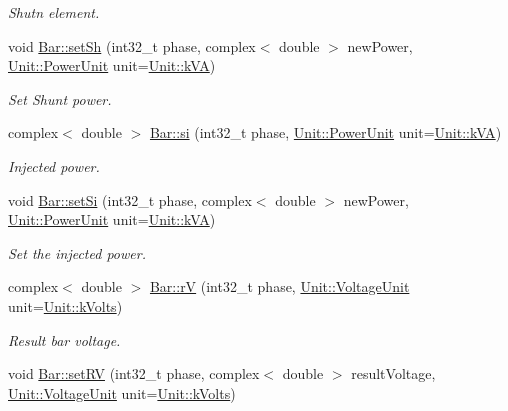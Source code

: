 \begin{DoxyCompactItemize}
\begin{DoxyCompactList}\small\item\em Shutn element. \end{DoxyCompactList}\item 
void \hyperlink{group___models_ga207abd3d0649a488e3c44cf2a501ed23}{Bar\+::set\+Sh} (int32\+\_\+t phase, complex$<$ double $>$ new\+Power, \hyperlink{class_unit_ace265ae255370ccacfd5370337572c3b}{Unit\+::\+Power\+Unit} unit=\hyperlink{class_unit_ace265ae255370ccacfd5370337572c3ba72b181a842ae2759488a2fa1410d3696}{Unit\+::k\+V\+A})
\begin{DoxyCompactList}\small\item\em Set Shunt power. \end{DoxyCompactList}\item 
complex$<$ double $>$ \hyperlink{group___models_ga02bbc279f1e133f66b12ee21e7bebcd8}{Bar\+::si} (int32\+\_\+t phase, \hyperlink{class_unit_ace265ae255370ccacfd5370337572c3b}{Unit\+::\+Power\+Unit} unit=\hyperlink{class_unit_ace265ae255370ccacfd5370337572c3ba72b181a842ae2759488a2fa1410d3696}{Unit\+::k\+V\+A})
\begin{DoxyCompactList}\small\item\em Injected power. \end{DoxyCompactList}\item 
void \hyperlink{group___models_ga74e510be49e50e4c14550b32e1dc92f9}{Bar\+::set\+Si} (int32\+\_\+t phase, complex$<$ double $>$ new\+Power, \hyperlink{class_unit_ace265ae255370ccacfd5370337572c3b}{Unit\+::\+Power\+Unit} unit=\hyperlink{class_unit_ace265ae255370ccacfd5370337572c3ba72b181a842ae2759488a2fa1410d3696}{Unit\+::k\+V\+A})
\begin{DoxyCompactList}\small\item\em Set the injected power. \end{DoxyCompactList}\item 
complex$<$ double $>$ \hyperlink{group___models_ga2d1f6bfbd8abaf168bb75bd8e5cd9b5e}{Bar\+::r\+V} (int32\+\_\+t phase, \hyperlink{class_unit_a55b07dfa9457e1eca2c7194fe0cfc3c1}{Unit\+::\+Voltage\+Unit} unit=\hyperlink{class_unit_a55b07dfa9457e1eca2c7194fe0cfc3c1aa54b2473993a702a3923525765bd6e4c}{Unit\+::k\+Volts})
\begin{DoxyCompactList}\small\item\em Result bar voltage. \end{DoxyCompactList}\item 
void \hyperlink{group___models_ga2b2c5a373d87025e79d26aa9c4cea75a}{Bar\+::set\+R\+V} (int32\+\_\+t phase, complex$<$ double $>$ result\+Voltage, \hyperlink{class_unit_a55b07dfa9457e1eca2c7194fe0cfc3c1}{Unit\+::\+Voltage\+Unit} unit=\hyperlink{class_unit_a55b07dfa9457e1eca2c7194fe0cfc3c1aa54b2473993a702a3923525765bd6e4c}{Unit\+::k\+Volts})

\end{DoxyCompactItemize}
